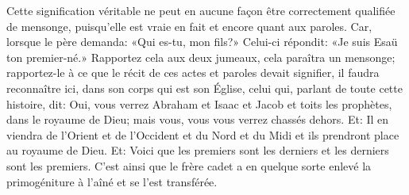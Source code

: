 Cette signification véritable
	ne peut en aucune façon être correctement qualifiée de mensonge,
	puisqu’elle est vraie en fait et encore quant aux paroles.
Car, lorsque le père demanda: «Qui es-tu, mon fils?»
	Celui-ci répondit: «Je suis Esaü ton premier-né.»
Rapportez cela aux deux jumeaux, cela paraîtra un mensonge;
	rapportez-le à ce que le récit de ces actes et paroles devait signifier,
	il faudra reconnaître ici, dans son corps qui est son Église,
	celui qui, parlant de toute cette histoire, dit:
	Oui, vous verrez Abraham et Isaac et Jacob et toits les prophètes,
		dans le royaume de Dieu;
	mais vous, vous vous verrez chassés dehors.
Et: Il en viendra de l’Orient et de l’Occident et du Nord et du Midi
	et ils prendront place au royaume de Dieu.
Et: Voici que les premiers sont les derniers et les derniers sont les premiers.
C’est ainsi que le frère cadet
	a en quelque sorte enlevé la primogéniture à l’aîné
	et se l’est transférée.
